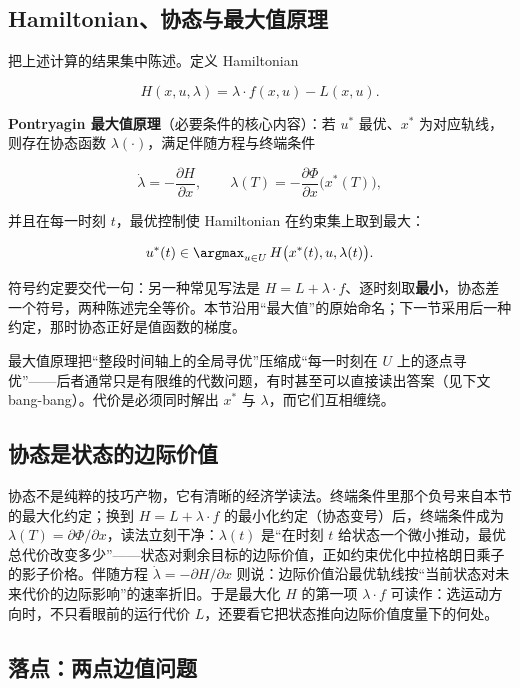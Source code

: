 \subsection{Hamiltonian、协态与最大值原理}

把上述计算的结果集中陈述。定义 Hamiltonian

\[
H(x,u,\lambda)=\lambda\cdot f(x,u)-L(x,u).
\]

\textbf{Pontryagin 最大值原理}（必要条件的核心内容）：若 \(u^\ast\) 最优、\(x^\ast\) 为对应轨线，则存在协态函数 \(\lambda(\cdot)\)，满足伴随方程与终端条件

\[
\dot\lambda=-\frac{\partial H}{\partial x},
\qquad
\lambda(T)=-\frac{\partial \Phi}{\partial x}\bigl(x^\ast(T)\bigr),
\]

并且在每一时刻 \(t\)，最优控制使 Hamiltonian 在约束集上取到最大：

\[
u^\ast(t)\in\argmax_{u\in U}\,H\bigl(x^\ast(t),u,\lambda(t)\bigr).
\]

符号约定要交代一句：另一种常见写法是 \(H=L+\lambda\cdot f\)、逐时刻取\textbf{最小}，协态差一个符号，两种陈述完全等价。本节沿用``最大值''的原始命名；下一节采用后一种约定，那时协态正好是值函数的梯度。

最大值原理把``整段时间轴上的全局寻优''压缩成``每一时刻在 \(U\) 上的逐点寻优''——后者通常只是有限维的代数问题，有时甚至可以直接读出答案（见下文 bang-bang）。代价是必须同时解出 \(x^\ast\) 与 \(\lambda\)，而它们互相缠绕。

\subsection{协态是状态的边际价值}

协态不是纯粹的技巧产物，它有清晰的经济学读法。终端条件里那个负号来自本节的最大化约定；换到 \(H=L+\lambda\cdot f\) 的最小化约定（协态变号）后，终端条件成为 \(\lambda(T)=\partial\Phi/\partial x\)，读法立刻干净：\(\lambda(t)\) 是``在时刻 \(t\) 给状态一个微小推动，最优总代价改变多少''——状态对剩余目标的边际价值，正如约束优化中拉格朗日乘子的影子价格。伴随方程 \(\dot\lambda=-\partial H/\partial x\) 则说：边际价值沿最优轨线按``当前状态对未来代价的边际影响''的速率折旧。于是最大化 \(H\) 的第一项 \(\lambda\cdot f\) 可读作：选运动方向时，不只看眼前的运行代价 \(L\)，还要看它把状态推向边际价值度量下的何处。

\subsection{落点：两点边值问题}

